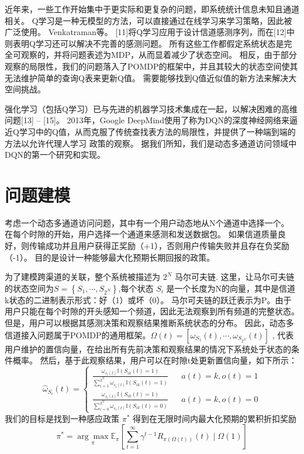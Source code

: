 近年来，一些工作开始集中于更实际和更复杂的问题，即系统统计信息未知且通道相关。 Q学习是一种无模型的方法，可以直接通过在线学习来学习策略，因此被广泛使用。 Venkatraman等。 [11]将Q学习应用于设计信道感测序列，而在[12]中则表明Q学习还可以解决不完善的感测问题。 所有这些工作都假定系统状态是完全可观察的，并将问题表述为MDP，从而显着减少了状态空间。 相反，由于部分观察的局限性，我们的问题落入了POMDP的框架中，并且其较大的状态空间使其无法维护简单的查询Q表来更新Q值。 需要能够找到Q值近似值的新方法来解决大空间挑战。

强化学习（包括Q学习）已与先进的机器学习技术集成在一起，以解决困难的高维问题[13] – [15]。 2013年，Google DeepMind使用了称为DQN的深度神经网络来逼近Q学习中的Q值，从而克服了传统查找表方法的局限性，并提供了一种端到端的方法以允许代理人学习 政策的观察。 据我们所知，我们是动态多通道访问领域中DQN的第一个研究和实现。

\section{  问题建模   }
考虑一个动态多通道访问问题，其中有一个用户动态地从N个通道中选择一个。 在每个时隙的开始，用户选择一个通道来感测和发送数据包。 如果信道质量良好，则传输成功并且用户获得正奖励（+1），否则用户传输失败并且存在负奖励（-1）。 目的是设计一种能够最大化预期长期回报的政策。 

为了建模跨渠道的关联，整个系统被描述为 $2^{N}$ 马尔可夫链. 这里，让马尔可夫链的状态空间为$S=\left\{S_{1},\cdots,S_{2^{N}}\right\}$,每个状态 $S_{i}$  是一个长度为N的向量，其中是信道k状态的二进制表示形式：好（1）或坏（0）。
马尔可夫链的跃迁表示为P。由于用户只能在每个时隙的开头感知一个频道，因此无法观察到所有频道的完整状态。 但是，用户可以根据其感测决策和观察结果推断系统状态的分布。 因此，动态多信道接入问题属于POMDP的通用框架。$\Omega \left ( t \right )=\left [ \omega _{S_{1}} \left ( t \right ),\cdots,\omega _{S_{2^{N}}} \left ( t \right )\right ]$ , 代表用户维护的置信向量，在给出所有先前决策和观察结果的情况下系统处于状态的条件概率。
然后，基于此观察结果，用户可以在时隙t处更新置信向量，如下所示：
\begin{equation}\tag*{1}
\hat{\omega }_{S_{i}}\left ( t \right )=\left\{
\begin{aligned}
\frac{\omega _{s_{i}\left ( t \right )}\mathbb{I}\left ( S_{ik}\left ( t \right ) =1\right )}{\sum_{i=1}^{2^{N}}\omega _{s_{i}\left ( t \right )}\mathbb{I}\left ( S_{ik}\left ( t \right ) =1\right )}& & a(t)=k,o(t)=1\\
\frac{\omega _{s_{i}\left ( t \right )}\mathbb{I}\left ( S_{ik}\left ( t \right ) =1\right )}{\sum_{i=0}^{2^{N}}\omega _{s_{i}\left ( t \right )}\mathbb{I}\left ( S_{ik}\left ( t \right ) =0\right )}& & a(t)=k,o(t)=0
\end{aligned}
\right.
\end{equation}
我们的目标是找到一种感应政策 $\pi^{*}$ 得到在无限时间内最大化预期的累积折扣奖励
\begin{equation}\tag*{2}
\pi ^{*}= \underset{\pi }{\arg \max}\mathbb{E}_{\pi}\left [ \sum_{t=1}^{\infty }\gamma ^{t-1} R_{\pi\left ( \Omega \left ( t \right ) \right )}\left ( t \right )\mid \Omega \left ( 1 \right )\right ]
\end{equation}

